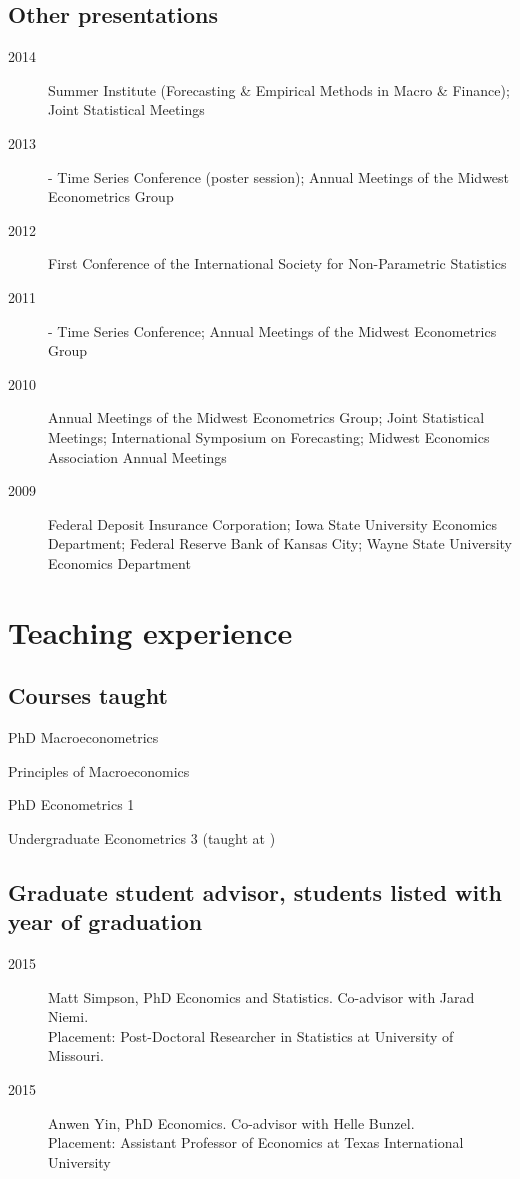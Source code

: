 \documentclass[12pt]{article}%
\newcommand{\allcaps}[1]{\textls{\MakeUppercase{#1}}}
\newcommand{\p}{\rlap{.}}
\begin{document}
\subsection*{Other presentations}
\begin{description}
\item[2014] \allcaps{NBER} Summer Institute (Forecasting \& Empirical Methods in
  Macro \& Finance); Joint Statistical Meetings
\item[2013] \allcaps{NBER}-\allcaps{NSF} Time Series Conference
  (poster session); Annual Meetings of the Midwest Econometrics Group
\item[2012] First Conference of the International Society for
  Non-Parametric Statistics
\item[2011] \allcaps{NBER}-\allcaps{NSF} Time Series Conference;
  Annual Meetings of the Midwest Econometrics Group
\item[2010] Annual Meetings of the Midwest Econometrics Group; Joint
  Statistical Meetings; International Symposium on Forecasting;
  Midwest Economics Association Annual Meetings
\item[2009] Federal Deposit Insurance Corporation; Iowa State
  University Economics Department; Federal Reserve Bank of Kansas City;
  Wayne State University Economics Department
\end{description}

\section*{Teaching experience}

\subsection*{Courses taught}
\begin{description}[noitemsep]
\item[2011\,--\,present] PhD Macroeconometrics
\item[2010\,--\,present] Principles of Macroeconomics
\item[2009\,--\,present] PhD Econometrics 1
\item[2009\p] Undergraduate Econometrics 3 (taught at \allcaps{UCSD})
\end{description}

\subsection*{Graduate student advisor, students listed with year of graduation}
\begin{description}
\item[2015] Matt Simpson, PhD Economics and Statistics.  Co-advisor
with Jarad Niemi. \\
Placement: Post-Doctoral Researcher in Statistics at University of Missouri.
\item[2015] Anwen Yin, PhD Economics. Co-advisor with Helle Bunzel. \\
Placement: Assistant Professor of Economics at Texas 
International University
\end{description}
\end{document}
